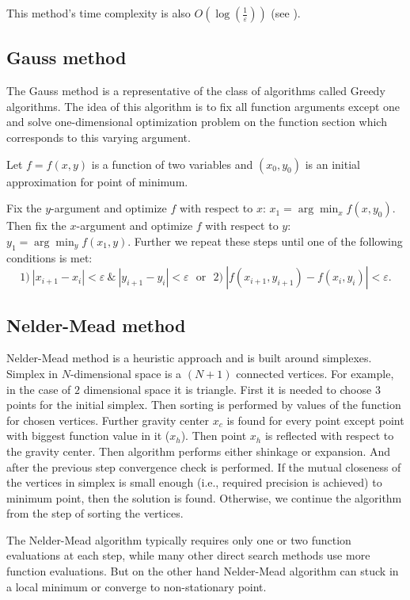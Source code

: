 \documentclass[12pt, bachelor, substylefile = algo_title.rtx]{disser}
\newcommand{\eps}{\varepsilon}
\theoremstyle{definition}
\begin{document}
This method's time complexity is also $O(\log(\frac{1}{\eps}))$ (see \cite{Luenberger15}).

\subsection{Gauss method}
The Gauss method is a representative of the class of algorithms called Greedy algorithms. The idea of this algorithm is to fix all function arguments except one and solve one-dimensional optimization problem on the function section which corresponds to this varying argument. 

Let $f = f(x, y)$ is a function of two variables and $(x_0, y_0)$ is an initial approximation for point of minimum.
\begin{outline}[enumerate]
\1 Fix the $y$-argument and optimize $f$ with respect to $x$: $x_1 = \arg \min_x f(x, y_0)$.
\1 Then fix the $x$-argument and optimize $f$ with respect to $y$: $y_1 = \arg \min_y f(x_1, y)$.
\1 Further we repeat these steps until one of the following conditions is met:
\[ 1)\ |x_{i+1}-x_i|<\eps\ \& \ |y_{i+1}-y_i|<\eps\ \ \ \text{or}\ \ \ 2)\ |f(x_{i+1}, y_{i+1}) - f(x_{i}, y_{i})| < \eps  .\]
\end{outline}

\subsection{Nelder-Mead method}
Nelder-Mead method is a heuristic approach and is built around simplexes. Simplex in $N$-dimensional space is a $(N+1)$ connected vertices.
For example, in the case of $2$ dimensional space it is triangle.
First it is needed to choose $3$ points for the initial simplex. 
Then sorting is performed by values of the function for chosen vertices. 
Further gravity center $x_c$ is found for every point except point with biggest function value in it ($x_h$).
Then point $x_h$ is reflected with respect to the gravity center.
Then algorithm performs either shinkage or expansion.
And after the previous step convergence check is performed. 
If the mutual closeness of the vertices in simplex is small enough (i.e., required precision is achieved) to minimum point, then the solution is found.
Otherwise, we continue the algorithm from the step of sorting the vertices.

The Nelder-Mead algorithm typically requires only one or two function evaluations at each step, while many other direct search methods use more function evaluations.
But on the other hand Nelder-Mead algorithm can stuck in a local minimum or converge to non-stationary point.
\end{document}
